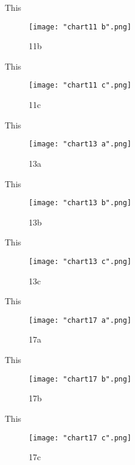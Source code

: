 \documentclass[12pt,letterpaper,oneside,titlepage]{article}
\begin{document}
\par This
\begin{figure}[h]
	\centering
	\texttt{[image: "chart11 b".png]}
	\caption{11b}
\end{figure}
\pagebreak
\par This
\begin{figure}[h]
	\centering
	\texttt{[image: "chart11 c".png]}
	\caption{11c}
\end{figure}
\pagebreak
\par This
\begin{figure}[h]
	\centering
	\texttt{[image: "chart13 a".png]}
	\caption{13a}
\end{figure}
\pagebreak
\par This
\begin{figure}[h]
	\centering
	\texttt{[image: "chart13 b".png]}
	\caption{13b}
\end{figure}
\pagebreak
\par This
\begin{figure}[h]
	\centering
	\texttt{[image: "chart13 c".png]}
	\caption{13c}
\end{figure}
\pagebreak
\par This
\begin{figure}[h]
	\centering
	\texttt{[image: "chart17 a".png]}
	\caption{17a}
\end{figure}
\pagebreak
\par This
\begin{figure}[h]
	\centering
	\texttt{[image: "chart17 b".png]}
	\caption{17b}
\end{figure}
\pagebreak
\par This
\begin{figure}[h]
	\centering
	\texttt{[image: "chart17 c".png]}
	\caption{17c}
\end{figure}
\end{document}
